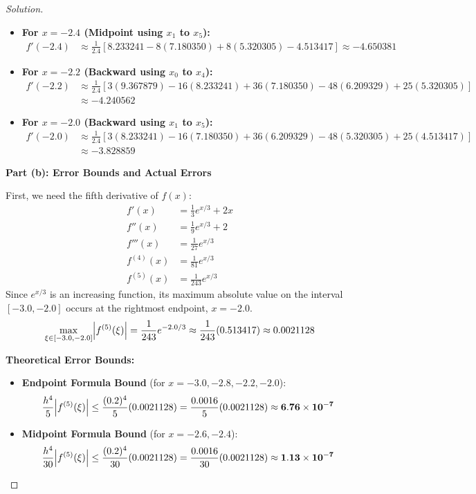 \documentclass[11pt, a4paper]{article}
\DeclarePairedDelimiter\abs{\lvert}{\rvert}
\newif\ifsolutionnewpage
\newenvironment{solution}
  {\begin{proof}[Solution]}
  {\end{proof}\ifsolutionnewpage\newpage\fi}
\begin{document}
\begin{solution}
\begin{itemize}
        \item \textbf{For $x = -2.4$ (Midpoint using $x_1$ to $x_5$):}
        \begin{align*}
        f'(-2.4) &\approx \frac{1}{2.4} \left[ 8.233241 - 8(7.180350) + 8(5.320305) - 4.513417 \right] \approx \mathbf{-4.650381}
        \end{align*}
    
        \item \textbf{For $x = -2.2$ (Backward using $x_0$ to $x_4$):}
        \begin{align*}
        f'(-2.2) &\approx \frac{1}{2.4} \left[ 3(9.367879) - 16(8.233241) + 36(7.180350) - 48(6.209329) + 25(5.320305) \right] \\
        &\approx \mathbf{-4.240562}
        \end{align*}
    
        \item \textbf{For $x = -2.0$ (Backward using $x_1$ to $x_5$):}
        \begin{align*}
        f'(-2.0) &\approx \frac{1}{2.4} \left[ 3(8.233241) - 16(7.180350) + 36(6.209329) - 48(5.320305) + 25(4.513417) \right] \\
        &\approx \mathbf{-3.828859}
        \end{align*}
    \end{itemize}
    
    \vspace{0.3cm}
    \textbf{Part (b): Error Bounds and Actual Errors}
    
    First, we need the fifth derivative of $f(x)$:
    \begin{align*}
    f'(x) &= \frac{1}{3}e^{x/3} + 2x \\
    f''(x) &= \frac{1}{9}e^{x/3} + 2 \\
    f'''(x) &= \frac{1}{27}e^{x/3} \\
    f^{(4)}(x) &= \frac{1}{81}e^{x/3} \\
    f^{(5)}(x) &= \frac{1}{243}e^{x/3}
    \end{align*}
    Since $e^{x/3}$ is an increasing function, its maximum absolute value on the interval $[-3.0, -2.0]$ occurs at the rightmost endpoint, $x = -2.0$.
    $$ \max_{\xi \in [-3.0, -2.0]} \abs[\Big]{f^{(5)}(\xi)} = \frac{1}{243}e^{-2.0/3} \approx \frac{1}{243}(0.513417) \approx 0.0021128 $$
    
    \textbf{Theoretical Error Bounds:}
    \begin{itemize}
        \item \textbf{Endpoint Formula Bound} (for $x = -3.0, -2.8, -2.2, -2.0$):
        $$ \frac{h^4}{5} \abs[\Big]{f^{(5)}(\xi)} \le \frac{(0.2)^4}{5}(0.0021128) = \frac{0.0016}{5}(0.0021128) \approx \mathbf{6.76 \times 10^{-7}} $$
        \item \textbf{Midpoint Formula Bound} (for $x = -2.6, -2.4$):
        $$ \frac{h^4}{30} \abs[\Big]{f^{(5)}(\xi)} \le \frac{(0.2)^4}{30}(0.0021128) = \frac{0.0016}{30}(0.0021128) \approx \mathbf{1.13 \times 10^{-7}} $$
    \end{itemize}
    

\end{solution}
\end{document}
